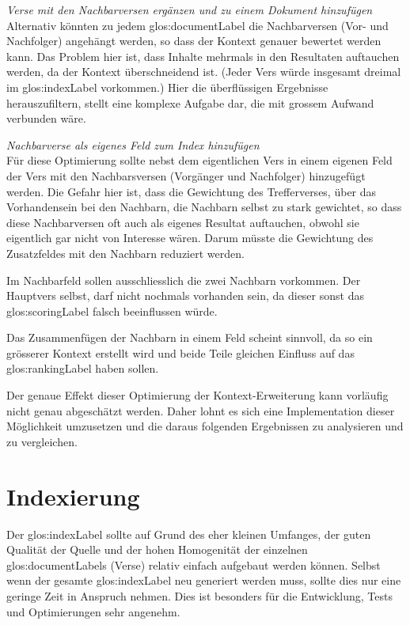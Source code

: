 \vspace{0.5em}
\textit{Verse mit den Nachbarversen ergänzen und zu einem Dokument hinzufügen}
\vspace{0.5em}\\
Alternativ könnten zu jedem \gls{glos:documentLabel} die Nachbarversen (Vor- und Nachfolger) angehängt werden, so dass der Kontext genauer bewertet werden kann.
Das Problem hier ist, dass Inhalte mehrmals in den Resultaten auftauchen werden, da der Kontext überschneidend ist. (Jeder Vers würde insgesamt dreimal im \gls{glos:indexLabel} vorkommen.)
Hier die überflüssigen Ergebnisse herauszufiltern, stellt eine komplexe Aufgabe dar, die mit grossem Aufwand verbunden wäre.

\vspace{0.5em}
\textit{Nachbarverse als eigenes Feld zum Index hinzufügen}
\vspace{0.5em}\\
Für diese Optimierung sollte nebst dem eigentlichen Vers in einem eigenen Feld der Vers mit den Nachbarsversen (Vorgänger und Nachfolger) hinzugefügt werden.
Die Gefahr hier ist, dass die Gewichtung des Trefferverses, über das Vorhandensein bei den Nachbarn, die Nachbarn selbst zu stark gewichtet, so dass diese Nachbarversen oft auch als eigenes Resultat auftauchen, obwohl sie eigentlich gar nicht von Interesse wären. Darum müsste die Gewichtung des Zusatzfeldes mit den Nachbarn reduziert werden.

Im Nachbarfeld sollen ausschliesslich die zwei Nachbarn vorkommen. Der Hauptvers selbst, darf nicht nochmals vorhanden sein, da dieser sonst das \gls{glos:scoringLabel} falsch beeinflussen würde.

Das Zusammenfügen der Nachbarn in einem Feld scheint sinnvoll, da so ein grösserer Kontext erstellt wird und beide Teile gleichen Einfluss auf das \gls{glos:rankingLabel} haben sollen.

Der genaue Effekt dieser Optimierung der Kontext-Erweiterung kann vorläufig nicht genau abgeschätzt werden.
Daher lohnt es sich eine Implementation dieser Möglichkeit umzusetzen und die daraus folgenden Ergebnissen zu analysieren und zu vergleichen.


\section{Indexierung}
\label{sec:indexing}
Der \gls{glos:indexLabel} sollte auf Grund des eher kleinen Umfanges, der guten Qualität der Quelle und der hohen Homogenität der einzelnen \glspl{glos:documentLabel} (Verse) relativ einfach aufgebaut werden können.
Selbst wenn der gesamte \gls{glos:indexLabel} neu generiert werden muss, sollte dies nur eine geringe Zeit in Anspruch nehmen.
Dies ist besonders für die Entwicklung, Tests und Optimierungen sehr angenehm.

